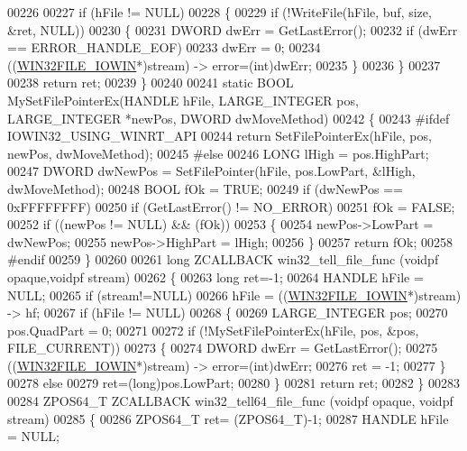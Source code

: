\begin{DoxyCode}
00226 
00227     \textcolor{keywordflow}{if} (hFile != NULL)
00228     \{
00229         \textcolor{keywordflow}{if} (!WriteFile(hFile, buf, size, &ret, NULL))
00230         \{
00231             DWORD dwErr = GetLastError();
00232             \textcolor{keywordflow}{if} (dwErr == ERROR\_HANDLE\_EOF)
00233                 dwErr = 0;
00234             ((\hyperlink{struct_w_i_n32_f_i_l_e___i_o_w_i_n}{WIN32FILE\_IOWIN}*)stream) -> error=(int)dwErr;
00235         \}
00236     \}
00237 
00238     \textcolor{keywordflow}{return} ret;
00239 \}
00240 
00241 \textcolor{keyword}{static} BOOL MySetFilePointerEx(HANDLE hFile, LARGE\_INTEGER pos, LARGE\_INTEGER *newPos,  DWORD dwMoveMethod)
00242 \{
00243 \textcolor{preprocessor}{#ifdef IOWIN32\_USING\_WINRT\_API}
00244     \textcolor{keywordflow}{return} SetFilePointerEx(hFile, pos, newPos, dwMoveMethod);
00245 \textcolor{preprocessor}{#else}
00246     LONG lHigh = pos.HighPart;
00247     DWORD dwNewPos = SetFilePointer(hFile, pos.LowPart, &lHigh, dwMoveMethod);
00248     BOOL fOk = TRUE;
00249     \textcolor{keywordflow}{if} (dwNewPos == 0xFFFFFFFF)
00250         \textcolor{keywordflow}{if} (GetLastError() != NO\_ERROR)
00251             fOk = FALSE;
00252     \textcolor{keywordflow}{if} ((newPos != NULL) && (fOk))
00253     \{
00254         newPos->LowPart = dwNewPos;
00255         newPos->HighPart = lHigh;
00256     \}
00257     \textcolor{keywordflow}{return} fOk;
00258 \textcolor{preprocessor}{#endif}
00259 \}
00260 
00261 \textcolor{keywordtype}{long} ZCALLBACK win32\_tell\_file\_func (voidpf opaque,voidpf stream)
00262 \{
00263     \textcolor{keywordtype}{long} ret=-1;
00264     HANDLE hFile = NULL;
00265     \textcolor{keywordflow}{if} (stream!=NULL)
00266         hFile = ((\hyperlink{struct_w_i_n32_f_i_l_e___i_o_w_i_n}{WIN32FILE\_IOWIN}*)stream) -> hf;
00267     \textcolor{keywordflow}{if} (hFile != NULL)
00268     \{
00269         LARGE\_INTEGER pos;
00270         pos.QuadPart = 0;
00271 
00272         \textcolor{keywordflow}{if} (!MySetFilePointerEx(hFile, pos, &pos, FILE\_CURRENT))
00273         \{
00274             DWORD dwErr = GetLastError();
00275             ((\hyperlink{struct_w_i_n32_f_i_l_e___i_o_w_i_n}{WIN32FILE\_IOWIN}*)stream) -> error=(int)dwErr;
00276             ret = -1;
00277         \}
00278         \textcolor{keywordflow}{else}
00279             ret=(long)pos.LowPart;
00280     \}
00281     \textcolor{keywordflow}{return} ret;
00282 \}
00283 
00284 ZPOS64\_T ZCALLBACK win32\_tell64\_file\_func (voidpf opaque, voidpf stream)
00285 \{
00286     ZPOS64\_T ret= (ZPOS64\_T)-1;
00287     HANDLE hFile = NULL;

\end{DoxyCode}
